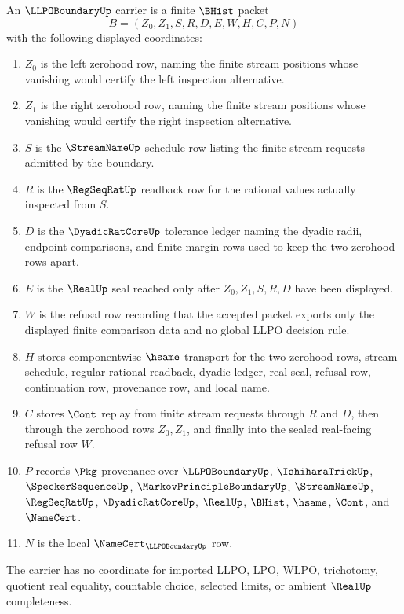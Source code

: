 \begin{definition}
\label{def:llpo-boundary-carrier}
An $\LLPOBoundaryUp$ carrier is a finite $\BHist$ packet
$$
B=(Z_0,Z_1,S,R,D,E,W,H,C,P,N)
$$
with the following displayed coordinates:
\begin{enumerate}
\item $Z_0$ is the left zerohood row, naming the finite stream positions whose vanishing would certify the left inspection alternative.
\item $Z_1$ is the right zerohood row, naming the finite stream positions whose vanishing would certify the right inspection alternative.
\item $S$ is the $\StreamNameUp$ schedule row listing the finite stream requests admitted by the boundary.
\item $R$ is the $\RegSeqRatUp$ readback row for the rational values actually inspected from $S$.
\item $D$ is the $\DyadicRatCoreUp$ tolerance ledger naming the dyadic radii, endpoint comparisons, and finite margin rows used to keep the two zerohood rows apart.
\item $E$ is the $\RealUp$ seal reached only after $Z_0,Z_1,S,R,D$ have been displayed.
\item $W$ is the refusal row recording that the accepted packet exports only the displayed finite comparison data and no global LLPO decision rule.
\item $H$ stores componentwise $\hsame$ transport for the two zerohood rows, stream schedule, regular-rational readback, dyadic ledger, real seal, refusal row, continuation row, provenance row, and local name.
\item $C$ stores $\Cont$ replay from finite stream requests through $R$ and $D$, then through the zerohood rows $Z_0,Z_1$, and finally into the sealed real-facing refusal row $W$.
\item $P$ records $\Pkg$ provenance over $\LLPOBoundaryUp$, $\IshiharaTrickUp$, $\SpeckerSequenceUp$, $\MarkovPrincipleBoundaryUp$, $\StreamNameUp$, $\RegSeqRatUp$, $\DyadicRatCoreUp$, $\RealUp$, $\BHist$, $\hsame$, $\Cont$, and $\NameCert$.
\item $N$ is the local $\NameCert_{\LLPOBoundaryUp}$ row.
\end{enumerate}
The carrier has no coordinate for imported LLPO, LPO, WLPO, trichotomy, quotient real equality, countable choice, selected limits, or ambient $\RealUp$ completeness.
\end{definition}

